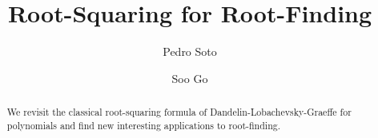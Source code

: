 \documentclass[sigconf]{acmart}
\begin{document}
\title{Root-Squaring for Root-Finding}

\author{Pedro Soto}



\author{Soo Go}
%

%
%
%
%

\renewcommand{\shortauthors}{Soto and Go, et al.}

\begin{abstract}
We revisit the classical root-squaring formula of Dandelin-Lobachevsky-Graeffe for polynomials and find new interesting applications to root-finding.
\end{abstract}
\end{document}
